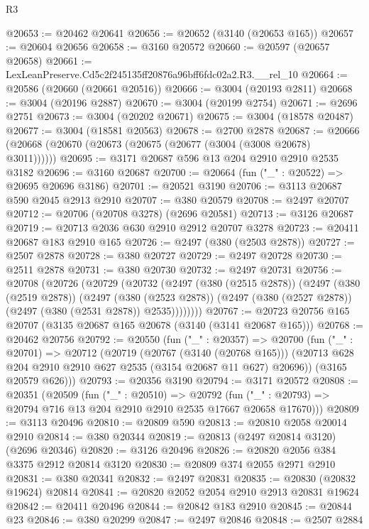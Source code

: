 \begin{lexlean}{R3}
\begin{coremodule}
@20653 := @20462 @20641
@20656 := @20652 (@3140 (@20653 @165))
@20657 := @20604 @20656
@20658 := @3160 @20572
@20660 := @20597 (@20657 @20658)
@20661 := LexLeanPreserve.Cd5c2f245135ff20876a96bff6fdc02a2.R3.__rel_10
@20664 := @20586 (@20660 (@20661 @20516))
@20666 := @3004 (@20193 @2811)
@20668 := @3004 (@20196 @2887)
@20670 := @3004 (@20199 @2754)
@20671 := @2696 @2751
@20673 := @3004 (@20202 @20671)
@20675 := @3004 (@18578 @20487)
@20677 := @3004 (@18581 @20563)
@20678 := @2700 @2878
@20687 := @20666 (@20668 (@20670 (@20673 (@20675 (@20677 (@3004 (@3008 @20678) @3011))))))
@20695 := @3171 @20687 @596 @13 @204 @2910 @2910 @2535 @3182
@20696 := @3160 @20687
@20700 := @20664 (fun ("_" : @20522) => @20695 @20696 @3186)
@20701 := @20521 @3190
@20706 := @3113 @20687 @590 @2045 @2913 @2910
@20707 := @380 @20579
@20708 := @2497 @20707
@20712 := @20706 (@20708 @3278) (@2696 @20581)
@20713 := @3126 @20687
@20719 := @20713 @2036 @630 @2910 @2912 @20707 @3278
@20723 := @20411 @20687 @183 @2910 @165
@20726 := @2497 (@380 (@2503 @2878))
@20727 := @2507 @2878
@20728 := @380 @20727
@20729 := @2497 @20728
@20730 := @2511 @2878
@20731 := @380 @20730
@20732 := @2497 @20731
@20756 := @20708
    (@20726
      (@20729
        (@20732
          (@2497
            (@380 (@2515 @2878))
            (@2497
              (@380 (@2519 @2878))
              (@2497
                (@380 (@2523 @2878))
                (@2497 (@380 (@2527 @2878)) (@2497 (@380 (@2531 @2878)) @2535))))))))
@20767 := @20723 @20756 @165 @20707 (@3135 @20687 @165 @20678 (@3140 (@3141 @20687 @165)))
@20768 := @20462 @20756
@20792 := @20550
    (fun ("_" : @20357) =>
    @20700
      (fun ("_" : @20701) =>
      @20712
        (@20719
          (@20767 (@3140 (@20768 @165)))
          (@20713 @628 @204 @2910 @2910 @627 @2535 (@3154 @20687 @11 @627) @20696))
        (@3165 @20579 @626)))
@20793 := @20356 @3190
@20794 := @3171 @20572
@20808 := @20351
    (@20509
      (fun ("_" : @20510) =>
      @20792 (fun ("_" : @20793) => @20794 @716 @13 @204 @2910 @2910 @2535 @17667 @20658 @17670)))
@20809 := @3113 @20496
@20810 := @20809 @590
@20813 := @20810 @2058 @20014 @2910
@20814 := @380 @20344
@20819 := @20813 (@2497 @20814 @3120) (@2696 @20346)
@20820 := @3126 @20496
@20826 := @20820 @2056 @384 @3375 @2912 @20814 @3120
@20830 := @20809 @374 @2055 @2971 @2910
@20831 := @380 @20341
@20832 := @2497 @20831
@20835 := @20830 (@20832 @19624) @20814
@20841 := @20820 @2052 @2054 @2910 @2913 @20831 @19624
@20842 := @20411 @20496
@20844 := @20842 @183 @2910
@20845 := @20844 @23
@20846 := @380 @20299
@20847 := @2497 @20846
@20848 := @2507 @2884

\end{coremodule}
\end{lexlean}
